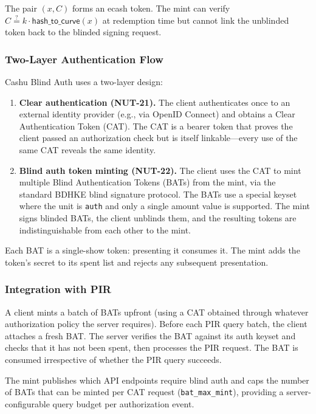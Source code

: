 The pair $(x, C)$ forms an ecash token. The mint can verify $C \stackrel{?}{=} k \cdot \mathsf{hash\_to\_curve}(x)$ at redemption time but cannot link the unblinded token back to the blinded signing request.

\subsubsection{Two-Layer Authentication Flow}

Cashu Blind Auth uses a two-layer design:

\begin{enumerate}[nolistsep,leftmargin=*]
    \item \textbf{Clear authentication (NUT-21).} The client authenticates once to an external identity provider (e.g., via OpenID Connect) and obtains a Clear Authentication Token (CAT). The CAT is a bearer token that proves the client passed an authorization check but is itself linkable---every use of the same CAT reveals the same identity.
    \item \textbf{Blind auth token minting (NUT-22).} The client uses the CAT to mint multiple Blind Authentication Tokens (BATs) from the mint, via the standard BDHKE blind signature protocol. The BATs use a special keyset where the unit is \texttt{auth} and only a single amount value is supported. The mint signs blinded BATs, the client unblinds them, and the resulting tokens are indistinguishable from each other to the mint.
\end{enumerate}

Each BAT is a single-show token: presenting it consumes it. The mint adds the token's secret to its spent list and rejects any subsequent presentation.

\subsubsection{Integration with PIR}

A client mints a batch of BATs upfront (using a CAT obtained through whatever authorization policy the server requires). Before each PIR query batch, the client attaches a fresh BAT. The server verifies the BAT against its auth keyset and checks that it has not been spent, then processes the PIR request. The BAT is consumed irrespective of whether the PIR query succeeds.

The mint publishes which API endpoints require blind auth and caps the number of BATs that can be minted per CAT request (\texttt{bat\_max\_mint}), providing a server-configurable query budget per authorization event.

